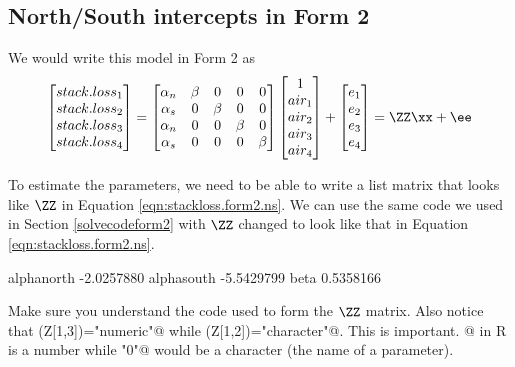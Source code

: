 \subsection{North/South intercepts in Form 2}\label{nsform2}
We would write this model in Form 2 as
\begin{equation}\label{eqn:stackloss.form2.ns}
\begin{bmatrix}stack.loss_1\\ stack.loss_2\\ stack.loss_3\\ stack.loss_4\end{bmatrix}
= 
\begin{bmatrix}
\alpha_n&\beta&0&0&0\\
\alpha_s&0&\beta&0&0\\
\alpha_n&0&0&\beta&0\\
\alpha_s&0&0&0&\beta
\end{bmatrix}\begin{bmatrix}1\\air_1\\air_2\\air_3\\air_4\end{bmatrix}
+
\begin{bmatrix}e_1\\e_2\\e_3\\e_4\end{bmatrix}=\ZZ\xx+\ee
\end{equation}

To estimate the parameters, we need to be able to write a list matrix that looks like $\ZZ$ in Equation \ref{eqn:stackloss.form2.ns}. We can use the same code we used in Section \ref{solvecodeform2} with $\ZZ$ changed to look like that in Equation \ref{eqn:stackloss.form2.ns}.
\begin{Schunk}
\begin{Soutput}
                 [,1]
alphanorth -2.0257880
alphasouth -5.5429799
beta        0.5358166
\end{Soutput}
\end{Schunk}
Make sure you understand the code used to form the $\ZZ$ matrix.  Also notice that \verb@class(Z[1,3])="numeric"@ while \verb@class(Z[1,2])="character"@.  This is important.  @ in R is a number while \verb@"0"@ would be a character (the name of a parameter).

